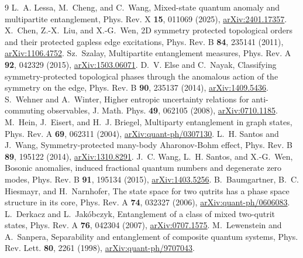 \documentclass[aps,prl,reprint,nofootinbib]{revtex4-2}
\begin{document}
\begin{thebibliography}{9}
 L.~A. Lessa, M.~Cheng, and C.~Wang, Mixed-state quantum
anomaly and multipartite entanglement, Phys. Rev. X \textbf{15}, 011069
(2025), \href{https://arxiv.org/abs/2401.17357}{arXiv:2401.17357}.
 X.~Chen, Z.-X.~Liu, and X.-G.~Wen, 2D symmetry protected
topological orders and their protected gapless edge excitations, Phys.
Rev. B \textbf{84}, 235141 (2011),
\href{https://arxiv.org/abs/1106.4752}{arXiv:1106.4752}.
 Sz.~Szalay, Multipartite entanglement measures,
Phys. Rev. A \textbf{92}, 042329 (2015),
\href{https://arxiv.org/abs/1503.06071}{arXiv:1503.06071}.
 D.~V. Else and C.~Nayak, Classifying symmetry-protected
topological phases through the anomalous action of the symmetry on the
edge, Phys. Rev. B \textbf{90}, 235137 (2014),
\href{https://arxiv.org/abs/1409.5436}{arXiv:1409.5436}.
 S.~Wehner and A.~Winter, Higher entropic
uncertainty relations for anti-commuting observables, J. Math. Phys.
\textbf{49}, 062105 (2008),
\href{https://arxiv.org/abs/0710.1185}{arXiv:0710.1185}.
 M.~Hein, J.~Eisert, and H.~J. Briegel, Multiparty
entanglement in graph states, Phys. Rev. A \textbf{69}, 062311 (2004),
\href{https://arxiv.org/abs/quant-ph/0307130}{arXiv:quant-ph/0307130}.
 L.~H. Santos and J.~Wang, Symmetry-protected many-body
Aharonov-Bohm effect, Phys. Rev. B \textbf{89}, 195122 (2014),
\href{https://arxiv.org/abs/1310.8291}{arXiv:1310.8291}.
 J.~C. Wang, L.~H. Santos, and X.-G.~Wen, Bosonic anomalies,
induced fractional quantum numbers and degenerate zero modes, Phys. Rev. B
\textbf{91}, 195134 (2015),
\href{https://arxiv.org/abs/1403.5256}{arXiv:1403.5256}.
 B.~Baumgartner, B.~C. Hiesmayr, and H.~Narnhofer,
The state space for two qutrits has a phase space structure in its core,
Phys. Rev. A \textbf{74}, 032327 (2006),
\href{https://arxiv.org/abs/quant-ph/0606083}{arXiv:quant-ph/0606083}.
 L.~Derkacz and L.~Jak\'obczyk, Entanglement of a class
of mixed two-qutrit states, Phys. Rev. A \textbf{76}, 042304 (2007),
\href{https://arxiv.org/abs/0707.1575}{arXiv:0707.1575}.
 M.~Lewenstein and A.~Sanpera, Separability and
entanglement of composite quantum systems, Phys. Rev. Lett. \textbf{80},
2261 (1998), \href{https://arxiv.org/abs/quant-ph/9707043}{arXiv:quant-ph/9707043}.
\end{thebibliography}
\end{document}
